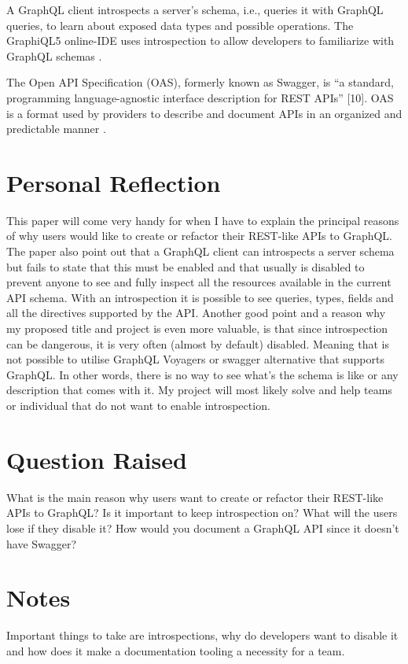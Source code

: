 A GraphQL client introspects a server's schema, i.e., queries it with GraphQL
queries, to learn about exposed data types and possible operations. The
GraphiQL5 online-IDE uses introspection to allow developers to familiarize with
GraphQL schemas \citep{witternGeneratingGraphQLWrappersREST2018}.

The Open API Specification (OAS), formerly known as Swagger, is ``a standard,
programming language-agnostic interface description for REST APIs'' [10]. OAS is
a format used by providers to describe and document APIs in an organized and
predictable manner \citep{witternGeneratingGraphQLWrappersREST2018}.

\section{Personal Reflection}
\label{s:Personal-Reflection-1}
This paper will come very handy for when I have to explain the principal reasons
of why users would like to create or refactor their REST-like APIs to GraphQL.
The paper also point out that a GraphQL client can introspects a server schema
but fails to state that this must be enabled and that usually is disabled to prevent
anyone to see and fully inspect all the resources available in the current API schema.
With an introspection it is possible to see queries, types, fields and all the directives
supported by the API.
Another good point and a reason why my proposed title and project is even more valuable,
is that since introspection can be dangerous, it is very often (almost by default) disabled.
Meaning that is not possible to utilise GraphQL Voyagers or swagger alternative that supports GraphQL.
In other words, there is no way to see what's the schema is like or any description that comes with it.
My project will most likely solve and help teams or individual that do not want to enable introspection.

\section{Question Raised}
\label{s:Question-Raised-1}
What is the main reason why users want to create or refactor their REST-like APIs to GraphQL?
Is it important to keep introspection on? What will the users lose if they disable it?
How would you document a GraphQL API since it doesn't have Swagger?

\section{Notes}
\label{s:Notes-1}
Important things to take are introspections, why do developers want to disable it and how does it make
a documentation tooling a necessity for a team.
